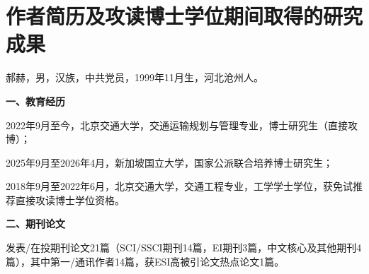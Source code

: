 \setlength{\baselineskip}{16pt}
\chapter{作者简历及攻读博士学位期间取得的研究成果}
\setlength{\parindent}{0pt}


郝赫，男，汉族，中共党员，1999年11月生，河北沧州人。

\vspace{10pt}
\textbf{一、教育经历}
\vspace{5pt}

2022年9月至今，北京交通大学，交通运输规划与管理专业，博士研究生（直接攻博）；

2025年9月至2026年4月，新加坡国立大学，国家公派联合培养博士研究生；

2018年9月至2022年6月，北京交通大学，交通工程专业，工学学士学位，获免试推荐直接攻读博士学位资格。

\vspace{10pt}
\textbf{二、期刊论文}
\vspace{5pt}

发表/在投期刊论文21篇（SCI/SSCI期刊14篇，EI期刊3篇，中文核心及其他期刊4篇），其中第一/通讯作者14篇，获ESI高被引论文热点论文1篇。

